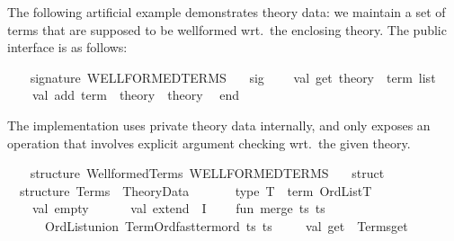 \begin{isabellebody}
\begin{isamarkuptext}
\begin{description}
  \end{description}%
\end{isamarkuptext}%
\isamarkuptrue%
%
\endisatagmlref
{\isafoldmlref}%
%
\isadelimmlref
%
\endisadelimmlref
%
\isadelimmlex
%
\endisadelimmlex
%
\isatagmlex
%
\begin{isamarkuptext}%
The following artificial example demonstrates theory
  data: we maintain a set of terms that are supposed to be wellformed
  wrt.\ the enclosing theory.  The public interface is as follows:%
\end{isamarkuptext}%
\isamarkuptrue%
%
\endisatagmlex
{\isafoldmlex}%
%
\isadelimmlex
%
\endisadelimmlex
%
\isadelimML
%
\endisadelimML
%
\isatagML
{}\isamarkupfalse%
\ {\isacharverbatimopen}\isanewline
\ \ signature\ WELLFORMED{\isacharunderscore}TERMS\ {\isacharequal}\isanewline
\ \ sig\isanewline
\ \ \ \ val\ get{\isacharcolon}\ theory\ {\isacharminus}{\isachargreater}\ term\ list\isanewline
\ \ \ \ val\ add{\isacharcolon}\ term\ {\isacharminus}{\isachargreater}\ theory\ {\isacharminus}{\isachargreater}\ theory\isanewline
\ \ end{\isacharsemicolon}\isanewline
{\isacharverbatimclose}%
\endisatagML
{\isafoldML}%
%
\isadelimML
%
\endisadelimML
%
\begin{isamarkuptext}%
\noindent The implementation uses private theory data
  internally, and only exposes an operation that involves explicit
  argument checking wrt.\ the given theory.%
\end{isamarkuptext}%
\isamarkuptrue%
%
\isadelimML
%
\endisadelimML
%
\isatagML
{}\isamarkupfalse%
\ {\isacharverbatimopen}\isanewline
\ \ structure\ Wellformed{\isacharunderscore}Terms{\isacharcolon}\ WELLFORMED{\isacharunderscore}TERMS\ {\isacharequal}\isanewline
\ \ struct\isanewline
\isanewline
\ \ structure\ Terms\ {\isacharequal}\ Theory{\isacharunderscore}Data\isanewline
\ \ {\isacharparenleft}\isanewline
\ \ \ \ type\ T\ {\isacharequal}\ term\ OrdList{\isachardot}T{\isacharsemicolon}\isanewline
\ \ \ \ val\ empty\ {\isacharequal}\ {\isacharbrackleft}{\isacharbrackright}{\isacharsemicolon}\isanewline
\ \ \ \ val\ extend\ {\isacharequal}\ I{\isacharsemicolon}\isanewline
\ \ \ \ fun\ merge\ {\isacharparenleft}ts{}{\isacharcomma}\ ts{}{\isacharparenright}\ {\isacharequal}\isanewline
\ \ \ \ \ \ OrdList{\isachardot}union\ Term{\isacharunderscore}Ord{\isachardot}fast{\isacharunderscore}term{\isacharunderscore}ord\ ts{}\ ts{}{\isacharsemicolon}\isanewline
\ \ {\isacharparenright}\isanewline
\isanewline
\ \ val\ get\ {\isacharequal}\ Terms{\isachardot}get{\isacharsemicolon}\isanewline

\end{isabellebody}
